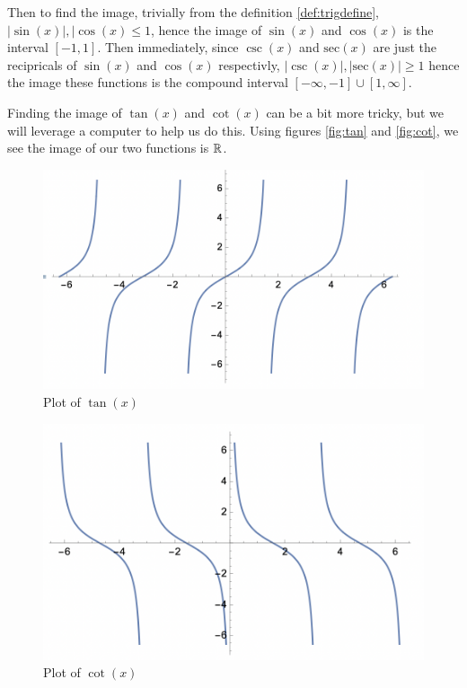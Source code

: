 Then to find the image, trivially from the definition \eqref{def:trigdefine}, $|\sin(x)|,|\cos(x)\le 1$, hence the image of $\sin(x)$ and $\cos(x)$ is the interval $[-1,1]$.
Then immediately, since $\csc(x)$ and $\text{sec}(x)$ are just the recipricals of $\sin(x)$ and $\cos(x)$ respectivly, $|\csc(x)|,|\text{sec}(x)|\ge 1$ hence the image these functions is the compound interval $[-\infty,-1]\cup[1,\infty]$.

Finding the image of $\tan(x)$ and $\cot(x)$ can be a bit more tricky, but we will leverage a computer to help us do this. Using figures \eqref{fig:tan} and \eqref{fig:cot}, we see the image of our two functions is $\mathbb{R}$.
\begin{figure}[h]
	\centering
	\includegraphics[scale=0.6]{chapters/assets/exp/tanplot.png}
	\caption{Plot of $\tan(x)$}
	\label{fig:tan}
\end{figure}
\begin{figure}[h]
	\centering
	\includegraphics[scale=0.6]{chapters/assets/exp/cotplot.png}
	\caption{Plot of $\cot(x)$}
	\label{fig:cot}
\end{figure}

